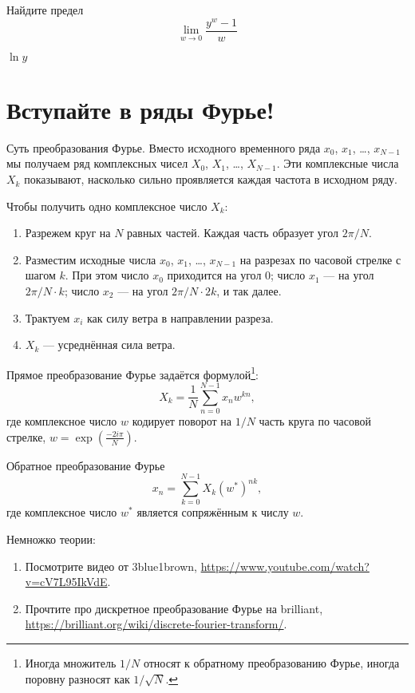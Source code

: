 \begin{problem}
  Найдите предел
  \[
    \lim_{w \to 0} \frac{y^w - 1}{w}
  \]
\begin{sol}
  $\ln y$
\end{sol}
\end{problem}








\chapter{Вступайте в ряды Фурье!}


Суть преобразования Фурье. Вместо исходного временного ряда $x_0$, $x_1$, \ldots, $x_{N-1}$ мы получаем ряд комплексных чисел $X_0$, $X_1$, \ldots, $X_{N-1}$.
Эти комплексные числа $X_k$ показывают, насколько сильно проявляется каждая частота в исходном ряду.

Чтобы получить одно комплексное число $X_k$:

\begin{enumerate}
  \item Разрежем круг на $N$ равных частей. Каждая часть образует угол $2\pi/N$.
  \item Разместим исходные числа $x_0$, $x_1$, \ldots, $x_{N-1}$ на разрезах по часовой стрелке с шагом $k$.
    При этом число $x_0$ приходится на угол $0$; число $x_1$ — на угол $2\pi/N \cdot k$;
число $x_2$ — на угол $2\pi/N \cdot 2k$, и так далее.
  \item Трактуем $x_i$ как силу ветра в направлении разреза.
  \item $X_k$ — усреднённая сила ветра.
\end{enumerate}


Прямое преобразование Фурье задаётся формулой\footnote{Иногда множитель $1/N$ относят к обратному преобразованию Фурье, иногда поровну разносят как $1/\sqrt{N}$.}:
\[
  X_k = \frac{1}{N} \sum_{n=0}^{N-1} x_n w^{kn},
\]
где комплексное число $w$ кодирует поворот на $1/N$ часть круга по часовой стрелке, $w = \exp\left(\frac{-2i\pi}{N} \right)$.



Обратное преобразование Фурье
\[
  x_n = \sum_{k=0}^{N-1} X_k (w^{*})^{nk},
\]
где комплексное число $w^{*}$ является сопряжённым к числу $w$.


\begin{problem}
  Немножко теории:
  \begin{enumerate}
    \item Посмотрите видео от 3blue1brown, \url{https://www.youtube.com/watch?v=cV7L95IkVdE}.
    \item Прочтите про дискретное преобразование Фурье на brilliant, \url{https://brilliant.org/wiki/discrete-fourier-transform/}.
  \end{enumerate}
\begin{sol}
\end{sol}
\end{problem}



